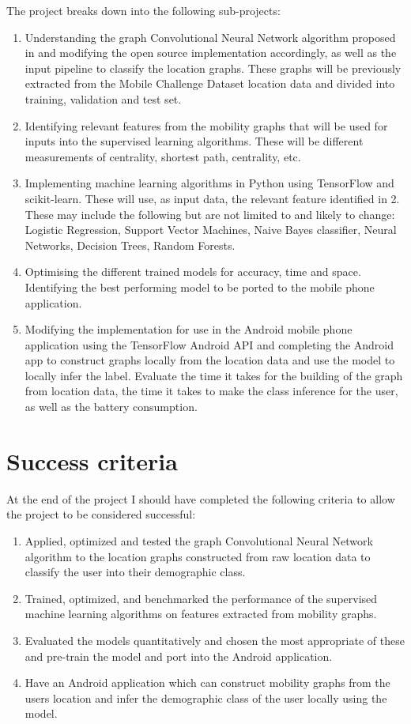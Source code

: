 \documentclass[12pt,a4paper,twoside]{article}
\begin{document}
The project breaks down into the following sub-projects:
\begin{enumerate}
\item  Understanding the graph Convolutional Neural Network algorithm proposed in \cite{CNN1} and modifying the open source implementation accordingly, as well as the input pipeline to classify the location graphs. These graphs will be previously extracted from the Mobile Challenge Dataset location data \cite{dataset} and divided into training, validation and test set.
\item Identifying relevant features from the mobility graphs that will be used for inputs into the supervised learning algorithms. These will be different measurements of centrality, shortest path, centrality, etc.
\item Implementing  machine learning algorithms in Python using TensorFlow and scikit-learn\cite{tensorflow, scikitlearn}. These will use, as input data, the relevant feature identified in 2. These may include the following but are not limited to and likely to change: Logistic Regression, Support Vector Machines, Naive Bayes classifier, Neural Networks, Decision Trees, Random Forests. 
\item Optimising the different trained models for accuracy, time and space. Identifying the best performing model to be ported to the mobile phone application.
\item Modifying the implementation for use in the Android mobile phone application using the TensorFlow Android API and completing the Android app to construct graphs locally from the location data and use the model to locally infer the label. Evaluate the time it takes for the building of the graph from location data, the time it takes to make the class inference for the user, as well as the battery consumption.

\end{enumerate}
\section*{Success criteria}
 At the end of the project I should have completed the following criteria to allow the project to be considered successful:
\begin{enumerate}
\item Applied, optimized and tested the graph Convolutional Neural Network algorithm to the location graphs constructed from raw location data to classify the user into their demographic class\cite{CNN1}.
\item Trained, optimized, and benchmarked the performance of the supervised machine learning algorithms on features extracted from mobility graphs.
\item Evaluated the models quantitatively and chosen the most appropriate of these and pre-train the model and port into the Android application. 
\item Have an Android application which can construct mobility graphs from the users location and infer the demographic class of the user locally using the model.

\end{enumerate}
\end{document}
